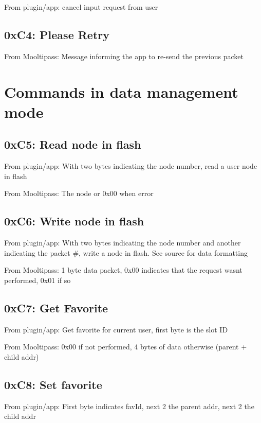 From plugin/app\+: cancel input request from user

\subsection*{0x\+C4\+: Please Retry }

From Mooltipass\+: Message informing the app to re-\/send the previous packet

\section*{Commands in data management mode }

\subsection*{0x\+C5\+: Read node in flash }

From plugin/app\+: With two bytes indicating the node number, read a user node in flash

From Mooltipass\+: The node or 0x00 when error

\subsection*{0x\+C6\+: Write node in flash }

From plugin/app\+: With two bytes indicating the node number and another indicating the packet \#, write a node in flash. See source for data formatting

From Mooltipass\+: 1 byte data packet, 0x00 indicates that the request wasn\textquotesingle{}t performed, 0x01 if so

\subsection*{0x\+C7\+: Get Favorite }

From plugin/app\+: Get favorite for current user, first byte is the slot ID

From Mooltipass\+: 0x00 if not performed, 4 bytes of data otherwise (parent + child addr)

\subsection*{0x\+C8\+: Set favorite }

From plugin/app\+: First byte indicates fav\+Id, next 2 the parent addr, next 2 the child addr

